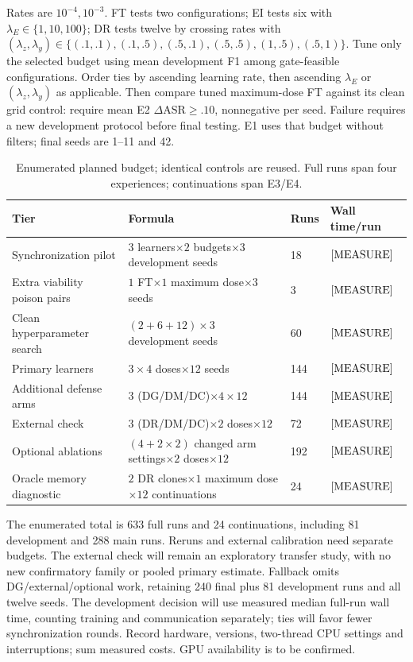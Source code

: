 \documentclass[10pt,a4paper]{article}
\newcommand{\meas}{\textnormal{[MEASURE]}}
\begin{document}
Rates are $10^{-4},10^{-3}$. FT tests two configurations; EI tests six with $\lambda_E\in\{1,10,100\}$; DR tests twelve by crossing rates with $(\lambda_z,\lambda_y)\in\{(.1,.1),(.1,.5),(.5,.1),(.5,.5),(1,.5),(.5,1)\}$. Tune only the selected budget using mean development F1 among gate-feasible configurations. Order ties by ascending learning rate, then ascending $\lambda_E$ or $(\lambda_z,\lambda_y)$ as applicable. Then compare tuned maximum-dose FT against its clean grid control: require mean E2 $\Delta\mathrm{ASR}\ge.10$, nonnegative per seed. Failure requires a new development protocol before final testing. E1 uses that budget without filters; final seeds are 1--11 and 42.

\begin{table}[htbp]
\centering\footnotesize
\caption{Enumerated planned budget; identical controls are reused. Full runs span four experiences; continuations span E3/E4.}
\label{tab:budget}
\begin{tabularx}{\linewidth}{Y L{4.8cm}L{1.1cm}L{2.5cm}}
\toprule
Tier & Formula & Runs & Wall time/run\\
\midrule
Synchronization pilot & $3$ learners$\times2$ budgets$\times3$ development seeds & 18 & $\meas$\\
Extra viability poison pairs & $1$ FT$\times1$ maximum dose$\times3$ seeds & 3 & $\meas$\\
Clean hyperparameter search & $(2+6+12)\times3$ development seeds & 60 & $\meas$\\
Primary learners & $3\times4$ doses$\times12$ seeds & 144 & $\meas$\\
Additional defense arms & $3$ (DG/DM/DC)$\times4\times12$ & 144 & $\meas$\\
External check & $3$ (DR/DM/DC)$\times2$ doses$\times12$ & 72 & $\meas$\\
Optional ablations & $(4+2\times2)$ changed arm settings$\times2$ doses$\times12$ & 192 & $\meas$\\
Oracle memory diagnostic & $2$ DR clones$\times1$ maximum dose$\times12$ continuations & 24 & $\meas$\\
\bottomrule
\end{tabularx}
\end{table}
The enumerated total is 633 full runs and 24 continuations, including 81 development and 288 main runs. Reruns and external calibration need separate budgets. The external check will remain an exploratory transfer study, with no new confirmatory family or pooled primary estimate. Fallback omits DG/external/optional work, retaining 240 final plus 81 development runs and all twelve seeds. The development decision will use measured median full-run wall time, counting training and communication separately; ties will favor fewer synchronization rounds. Record hardware, versions, two-thread CPU settings and interruptions; sum measured costs. GPU availability is to be confirmed.
\end{document}
